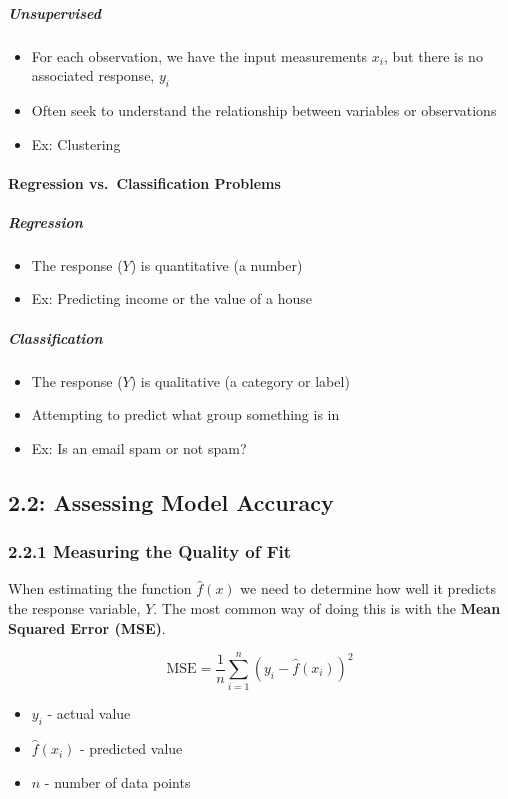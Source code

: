    \subparagraph{Unsupervised}
   \begin{itemize}
   	\tightlist
\item  For each observation, we have the input measurements \(x_i\), but  there is no associated response, \(y_i\)
\item  Often seek to understand the relationship between variables or  observations
\item  Ex: Clustering
\end{itemize}

\paragraph{Regression vs.~Classification Problems}\label{regression-vs.-classification-problems}

\subparagraph{Regression}\label{regression}

\begin{itemize}
\tightlist
\item  The response (\(Y\)) is quantitative (a number)
\item  Ex: Predicting income or the value of a house 
\end{itemize}
\subparagraph{Classification}
\begin{itemize}
\tightlist
\item  The response (\(Y\)) is qualitative (a category or label)
\item  Attempting to predict what group something is in
\item  Ex: Is an email spam or not spam?
\end{itemize}

\subsection*{2.2: Assessing Model Accuracy}\label{assessing-model-accuracy}

\subsubsection*{2.2.1 Measuring the Quality of Fit}\label{measuring-the-quality-of-fit}

When estimating the function \(\hat f (x)\) we need to determine how well it predicts the response variable, \(Y\).
The most common way of doing this is with the \textbf{Mean Squared Error (MSE)}.

\begin{equation*}
	\text{MSE} = \frac{1}{n}\sum_{i=1}^{n}\left(y_i - \hat f(x_i) \right)^2 
\end{equation*}
\begin{itemize}
	\tightlist
	\item \(y_i\) - actual value 
	\item  \(\hat{f}(x_i)\) - predicted value 
	\item \(n\) - number of data points
\end{itemize}

